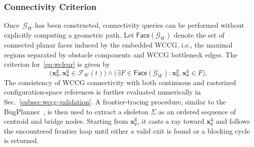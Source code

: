 \subsubsection{Connectivity Criterion}\label{subsubsec:wccg-criterion}
Once~$\mathcal{G}_W$ has been constructed, connectivity queries can be
performed without explicitly computing a geometric path. Let
$\textsf{Face}(\mathcal{G}_W)$ denote the set of connected planar faces induced
by the embedded WCCG, i.e., the maximal regions separated by obstacle
components and WCCG bottleneck edges. The criterion for~\eqref{eq:wclear}
is given by
\begin{equation}\label{eq:wccg_criterion}
\big(\mathbf{x}_\texttt{V}^{\texttt{S}},\mathbf{x}_\texttt{V}^{\texttt{G}}\in
\mathcal{F}_W(t)\big)
\wedge
\big( \exists F\in\textsf{Face}(\mathcal{G}_W):
{\mathbf{x}_\texttt{V}^{\texttt{S}},\mathbf{x}_\texttt{V}^{\texttt{G}}}\in F \big),
\end{equation}
 The consistency of WCCG connectivity with both continuous and rasterized configuration-space references is further evaluated numerically
in Sec.~\ref{subsec:wccg-validation}.
A frontier-tracing procedure, similar to the
BugPlanner~\cite{McGuireCroonTuyls2019}, is then used to extract a skeleton
$\Sigma$ as an ordered sequence of centroid and bridge nodes. Starting from
$\mathbf{x}_\texttt{V}^{\texttt{S}}$, it casts a ray toward
$\mathbf{x}_\texttt{V}^{\texttt{G}}$ and follows the encountered frontier loop
until either a valid exit is found or a blocking cycle is returned.








